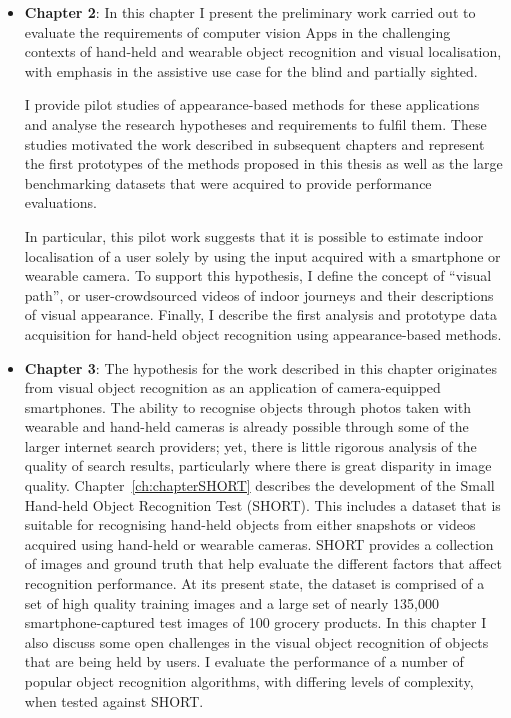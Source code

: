 \begin{itemize}

\item \textbf{Chapter 2}: In this chapter I present the preliminary work carried out to evaluate the requirements of computer vision Apps in the challenging contexts of hand-held and wearable object recognition and visual localisation, with emphasis in the assistive use case for the blind and partially sighted. %

I provide pilot studies of appearance-based methods for these applications and analyse the research hypotheses and requirements to fulfil them. These studies motivated the work described in subsequent chapters and represent the first prototypes of the methods proposed in this thesis as well as the large benchmarking datasets that were acquired to provide performance evaluations.

In particular, this pilot work suggests that it is possible to estimate indoor localisation of a user solely by using the input acquired with a smartphone or wearable camera. To support this hypothesis, I define the concept of ``visual path'', or user-crowdsourced videos of indoor journeys and their descriptions of visual appearance. Finally, I describe the first analysis and prototype data acquisition for hand-held object recognition using appearance-based methods.


\item \textbf{Chapter 3}: The hypothesis for the work described in this chapter originates from visual object recognition as an application of camera-equipped smartphones. The ability to recognise objects through photos taken with wearable and hand-held cameras is already possible through some of the larger internet search providers; yet, there is little rigorous analysis of the quality of search results, particularly where there is great disparity in image quality. Chapter~\ref{ch:chapterSHORT} describes the development of the Small Hand-held Object Recognition Test (SHORT). This includes a dataset that is suitable for recognising hand-held objects from either snapshots or videos acquired using hand-held or wearable cameras. SHORT provides a collection of images and ground truth that help evaluate the different factors that affect recognition performance. At its present state, the dataset is comprised of a set of high quality training images and a large set of nearly 135,000 smartphone-captured test images of 100 grocery products. In this chapter I also discuss some open challenges in the visual object recognition of objects that are being held by users. I evaluate the performance of a number of popular object recognition algorithms, with differing levels of complexity, when tested against SHORT.


\end{itemize}
